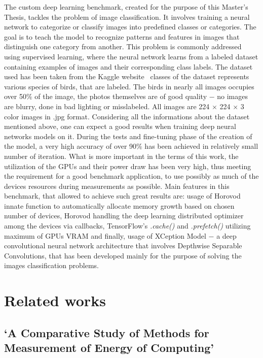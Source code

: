 The custom deep learning benchmark, created for the purpose of this Master's
Thesis, tackles the problem of image classification. It involves training
a neural network to categorize or classify images into predefined classes
or categories. The goal is to teach the model to recognize patterns and
features in images that distinguish one category from another. This problem
is commonly addressed using supervised learning, where the neural network
learns from a labeled dataset containing examples of images and their
corresponding class labels. The dataset used has been taken from the Kaggle
website~\cite{Kaggle_Dataset} classes of the dataset represents various
species of birds, that are labeled. The birds in nearly all images occupies
over 50\% of the image, the photos themselves are of good quality $-$ no images
are blurry, done in bad lighting or misslabeled. All images are 224 $\times$
224 $\times$ 3 color images in \@.jpg format. Considering all the informations
about the dataset mentioned above, one can expect a good results when training
deep neural networks models on it. During the tests and fine-tuning phase of
the creation of the model, a very high accuracy of over 90\% has been achieved
in relatively small number of iteration. What is more important in the terms
of this work, the utilization of the GPUs and their power draw has been very
high, thus meeting the requirement for a good benchmark application, to use
possibly as much of the devices resources during measurements as possible.
Main features in this benchmark, that allowed to achieve such great results
are: usage of Horovod innate function to automatically allocate memory growth
based on chosen number of devices, Horovod handling the deep learning
distributed optimizer among the devices via callbacks, TensorFlow's
\emph{.cache\@()} and \emph{.prefetch\@()} utilizing maximum of GPUs VRAM and
finally, usage of XCeption Model $-$ a deep convolutional neural network
architecture that involves Depthwise Separable Convolutions, that has been
developed mainly for the purpose of solving the images classification problems.



\chapter*{Related works}

\section{`A Comparative Study of Methods for Measurement
of Energy of Computing'}

